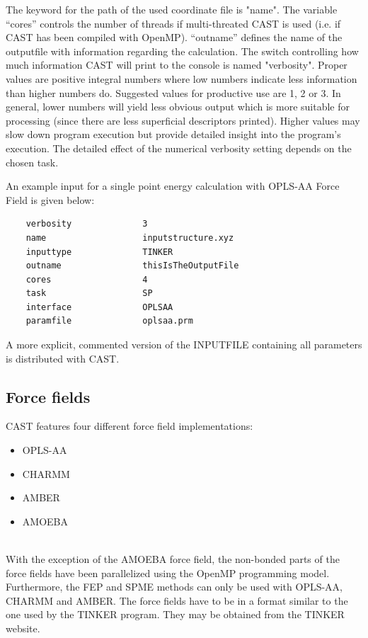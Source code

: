 \documentclass[10pt,a4paper]{article} %
\begin{document}
	The keyword for the path of the used coordinate file is "name". The variable ``cores'' controls the number of threads if multi-threated \ac{CAST} is used (i.e. if \ac{CAST} has been compiled with OpenMP\supercite{openmp08}). ``outname'' defines the name of the outputfile with information regarding the calculation.
	The switch controlling how much information \ac{CAST} will print to the console is named "verbosity". Proper values are positive integral numbers where low numbers indicate less information than higher numbers do. Suggested values for productive use are 1, 2 or 3. In general, lower numbers will yield less obvious output which is  more suitable for processing (since there are less superficial descriptors printed). Higher values may slow down program execution but provide detailed insight into the program's execution. The detailed effect of the numerical verbosity setting depends on the chosen task.

	An example input for a single point energy calculation with \ac{OPLS-AA} Force Field\supercite{oplsaa, oplsaa2} is given below:
	
	\begin{lstlisting}
	verbosity              3
	name                   inputstructure.xyz
	inputtype              TINKER
	outname                thisIsTheOutputFile
	cores                  4
	task                   SP
	interface              OPLSAA
	paramfile              oplsaa.prm\end{lstlisting}

	A more explicit, commented version of the INPUTFILE containing all parameters is distributed with \ac{CAST}.
		
	\subsection{Force fields}
	\ac{CAST} features four different force field implementations:\\
	\begin{itemize}
	 \item \acf{OPLS-AA}\supercite{oplsaa, oplsaa2} \item \acf{CHARMM}\supercite{charmm}
	 \item \acf{AMBER}\supercite{amber}
	 \item \acf{AMOEBA}\supercite{amoeba_current, amoeba_current2}
	\end{itemize}~\\
	With the exception of the \ac{AMOEBA} force field, the non-bonded parts of the force fields have been parallelized using the OpenMP programming model. Furthermore, the \ac{FEP} and \ac{SPME} methods can only be used with \ac{OPLS-AA}, \ac{CHARMM} and \ac{AMBER}. The force fields have to be in a format similar to the one used by the TINKER\supercite{tinker} program. They may be obtained from the TINKER\supercite{tinker} website.
\end{document}
